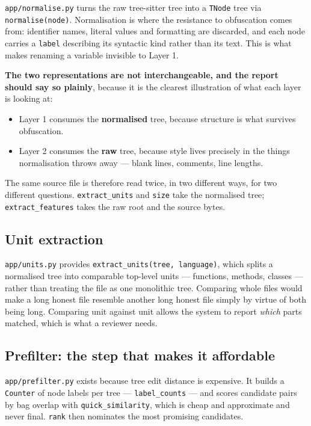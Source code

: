 \texttt{app/normalise.py} turns the raw tree-sitter tree into a
\texttt{TNode} tree via \texttt{normalise(node)}. Normalisation is where
the resistance to obfuscation comes from: identifier names, literal
values and formatting are discarded, and each node carries a
\texttt{label} describing its syntactic kind rather than its text. This
is what makes renaming a variable invisible to Layer 1.

\textbf{The two representations are not interchangeable, and the report
should say so plainly}, because it is the clearest illustration of what
each layer is looking at:

\begin{itemize}
\tightlist
\item
  Layer 1 consumes the \textbf{normalised} tree, because structure is
  what survives obfuscation.
\item
  Layer 2 consumes the \textbf{raw} tree, because style lives precisely
  in the things normalisation throws away --- blank lines, comments,
  line lengths.
\end{itemize}

The same source file is therefore read twice, in two different ways, for
two different questions. \texttt{extract\_units} and \texttt{size} take
the normalised tree; \texttt{extract\_features} takes the raw root and
the source bytes.

\hypertarget{unit-extraction}{%
\subsection{Unit extraction}\label{unit-extraction}}

\texttt{app/units.py} provides \texttt{extract\_units(tree,\ language)},
which splits a normalised tree into comparable top-level units ---
functions, methods, classes --- rather than treating the file as one
monolithic tree. Comparing whole files would make a long honest file
resemble another long honest file simply by virtue of both being long.
Comparing unit against unit allows the system to report \emph{which}
parts matched, which is what a reviewer needs.

\hypertarget{prefilter-the-step-that-makes-it-affordable}{%
\subsection{Prefilter: the step that makes it
affordable}\label{prefilter-the-step-that-makes-it-affordable}}

\texttt{app/prefilter.py} exists because tree edit distance is
expensive. It builds a \texttt{Counter} of node labels per tree ---
\texttt{label\_counts} --- and scores candidate pairs by bag overlap
with \texttt{quick\_similarity}, which is cheap and approximate and
never final. \texttt{rank} then nominates the most promising candidates.

